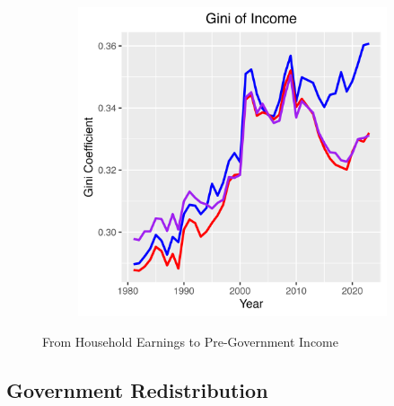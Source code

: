 \documentclass{article}
\begin{document}
\begin{figure}
\begin{subfigure}[t]{0.475\textwidth}
        \label{fig:Trans_Asset_Var2}
    \end{subfigure}
    \begin{subfigure}[t]{0.475\textwidth}
        \centering
        \includegraphics[width=\textwidth]{figures/Fig_4/Fig_4d_Gini_inc.png}
        \label{fig:Trans_Asset_Gini2}
    \end{subfigure}
    \caption{From Household Earnings to Pre-Government Income}
    \label{fig:Trans_Asset}
\end{figure}

\subsection{Government Redistribution}
\end{document}
